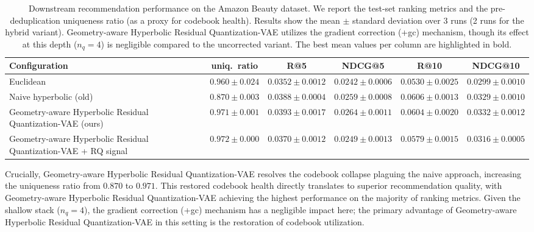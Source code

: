 \documentclass[12pt]{report}
\begin{document}
\begin{table}[h]
\centering
\caption{Downstream recommendation performance on the Amazon Beauty dataset. We report the test-set ranking metrics and the pre-deduplication uniqueness ratio (as a proxy for codebook health). Results show the mean $\pm$ standard deviation over 3 runs (2 runs for the hybrid variant). Geometry-aware Hyperbolic Residual Quantization-VAE utilizes the gradient correction (+gc) mechanism, though its effect at this depth ($n_q=4$) is negligible compared to the uncorrected variant. The best mean values per column are highlighted in bold.}
\label{tab:rec_beauty}
\begin{tabular}{lccccc}
\hline
Configuration & uniq.\ ratio & R@5 & NDCG@5 & R@10 & NDCG@10 \\
\hline
Euclidean & $0.960 \pm 0.024$ & $0.0352 \pm 0.0012$ & $0.0242 \pm 0.0006$ & $0.0530 \pm 0.0025$ & $0.0299 \pm 0.0010$ \\
Naive hyperbolic (old) & $0.870 \pm 0.003$ & $0.0388 \pm 0.0004$ & $0.0259 \pm 0.0008$ & $\mathbf{0.0606 \pm 0.0013}$ & $0.0329 \pm 0.0010$ \\
Geometry-aware Hyperbolic Residual Quantization-VAE (ours) & $0.971 \pm 0.001$ & $\mathbf{0.0393 \pm 0.0017}$ & $\mathbf{0.0264 \pm 0.0011}$ & $0.0604 \pm 0.0020$ & $\mathbf{0.0332 \pm 0.0012}$ \\
Geometry-aware Hyperbolic Residual Quantization-VAE + RQ signal & $\mathbf{0.972 \pm 0.000}$ & $0.0370 \pm 0.0012$ & $0.0249 \pm 0.0013$ & $0.0579 \pm 0.0015$ & $0.0316 \pm 0.0005$ \\
\hline
\end{tabular}
\end{table}

Crucially, Geometry-aware Hyperbolic Residual Quantization-VAE resolves the codebook collapse plaguing the naive approach, increasing the uniqueness ratio from $0.870$ to $0.971$. This restored codebook health directly translates to superior recommendation quality, with Geometry-aware Hyperbolic Residual Quantization-VAE achieving the highest performance on the majority of ranking metrics. Given the shallow stack ($n_q=4$), the gradient correction (+gc) mechanism has a negligible impact here; the primary advantage of Geometry-aware Hyperbolic Residual Quantization-VAE in this setting is the restoration of codebook utilization.
\end{document}
